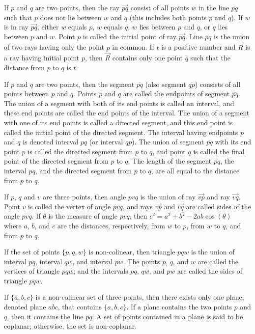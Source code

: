 \documentclass{article}
\begin{document}
If $p$ and $q$ are two points, then the ray $\overrightarrow{pq}$ consist of all points $w$ in the line $\overline{pq}$ such that $p$ does not lie between $w$ and $q$ (this includes both points $p$ and $q$). If $w$ is in ray $\overrightarrow{pq}$, either $w$ equals $p$, $w$ equals $q$, $w$ lies between $p$ and $q$, or $q$ lies between $p$ and $w$. Point $p$ is called the initial point of ray $\overrightarrow{pq}$. Line $\overline{pq}$ is the union of two rays having only the point $p$ in common. If $t$ is a positive number and $\overrightarrow{R}$ is a ray having initial point $p$, then $\overrightarrow{R}$ contains only one point $q$ such that the distance from $p$ to $q$ is $t$.

If $p$ and $q$ are two points, then the segment $\overline{pq}$ (also segment $\overline{qp}$) consists of all points between $p$ and $q$. Points $p$ and $q$ are called the endpoints of segment $\overline{pq}$. The union of a segment with both of its end points is called an interval, and these end points are called the end points of the interval. The union of a segment with one of its end points is called a directed segment, and this end point is called the initial point of the directed segment. The interval having endpoints $p$ and $q$ is denoted interval $pq$ (or interval $qp$). The union of segment $\overline{pq}$ with its end point $p$ is called the directed segment from $p$ to $q$, and point $q$ is called the final point of the directed segment from $p$ to $q$. The length of the segment $\overline{pq}$, the interval $pq$, and the directed segment from $p$ to $q$, are all equal to the distance from $p$ to $q$.

If $p$, $q$ and $v$ are three points, then angle $p v q$ is the union of ray $\overrightarrow{v p}$ and ray $\overrightarrow{v q}$. Point $v$ is called the vertex of angle $p v q$, and rays $\overrightarrow{v p}$ and $\overrightarrow{v q}$ are called sides of the angle $p v q$. If $\theta$ is the measure of angle $p v q$, then $c^2 = a^2+b^2-2ab \cos(\theta)$ where $a$, $b$, and $c$ are the distances, respectively, from $w$ to $p$, from $w$ to $q$, and from $p$ to $q$.

If the set of points $\{ p,q,w \}$ is non-colinear, then triangle $p q w$ is the union of interval $p q$, interval $q w$, and interval $p w$. The points $p$, $q$, and $w$ are called the vertices of triangle $p q w$; and the intervals $p q$, $q w$, and $p w$ are called the sides of triangle $p q w$.

If $\{ a,b,c \}$ is a non-colinear set of three points, then there exists only one plane, denoted plane $a b c$, that contains $\{ a,b,c \}$. If a plane contains the two points $p$ and $q$, then it contains the line $\overline{p q}$. A set of points contained in a plane is said to be coplanar; otherwise, the set is non-coplanar.
\end{document}
